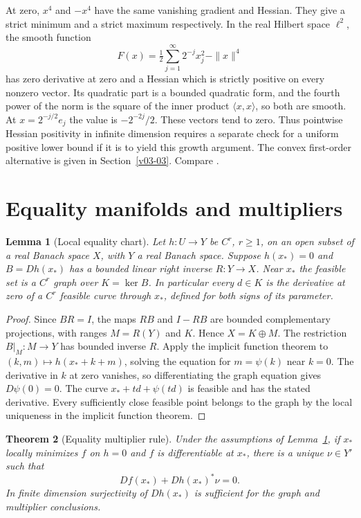 \documentclass[11pt,oneside,openany]{book}
\theoremstyle{plain}
\newtheorem{theorem}{Theorem}[chapter]
\newtheorem{lemma}[theorem]{Lemma}
\theoremstyle{definition}
\theoremstyle{remark}
\begin{document}
At zero, \(x^4\) and \(-x^4\) have the same vanishing
gradient and Hessian. They give a strict minimum and
a strict maximum respectively. In the real Hilbert
space \(\ell^2\), the smooth function
\[
 F(x)=\tfrac12\sum_{j=1}^\infty 2^{-j}x_j^2-\|x\|^4
\]
has zero derivative at zero and a Hessian which is
strictly positive on every nonzero vector. Its
quadratic part is a bounded quadratic form, and
the fourth power of the norm is the square of the
inner product \(\langle x,x\rangle\), so both are
smooth. At \(x=2^{-j/2}e_j\) the value is
\(-2^{-2j}/2\). These vectors tend to zero.
Thus pointwise Hessian positivity in infinite
dimension requires a separate check for a uniform
positive lower bound if it is to yield this growth
argument. The convex first-order alternative is
given in Section~\ref{v03-03}.
Compare \cite[Theorems 2.1--2.5]{NocedalWright}.

\section{Equality manifolds and multipliers}
\label{v06-02}

\begin{lemma}[Local equality chart]\label{lem:equality-chart}
Let \(h:U\to Y\) be \(C^r\), \(r\ge1\), on an open subset
of a real Banach space \(X\), with \(Y\) a real Banach
space. Suppose \(h(x_*)=0\) and \(B=Dh(x_*)\) has a
bounded linear right inverse \(R:Y\to X\).
Near \(x_*\) the feasible set is a \(C^r\) graph
over \(K=\ker B\). In particular every \(d\in K\)
is the derivative at zero of a \(C^r\) feasible
curve through \(x_*\), defined for both signs of its
parameter.
\end{lemma}

\begin{proof}
Since \(BR=I\), the maps \(RB\) and \(I-RB\) are
bounded complementary projections, with ranges
\(M=R(Y)\) and \(K\). Hence \(X=K\oplus M\).
The restriction \(B|_M:M\to Y\) has bounded inverse
\(R\). Apply the implicit function theorem to
\((k,m)\mapsto h(x_*+k+m)\), solving the equation
for \(m=\psi(k)\) near \(k=0\).
The derivative in \(k\) at zero vanishes, so
differentiating the graph equation gives \(D\psi(0)=0\).
The curve \(x_*+td+\psi(td)\) is feasible and has
the stated derivative. Every sufficiently close
feasible point belongs to the graph by the
local uniqueness in the implicit function theorem.
\end{proof}

\begin{theorem}[Equality multiplier rule]\label{thm:equality-multipliers}
Under the assumptions of Lemma~\ref{lem:equality-chart},
if \(x_*\) locally minimizes \(f\) on \(h=0\) and \(f\)
is differentiable at \(x_*\), there is a unique
\(\nu\in Y'\) such that
\[
 Df(x_*)+Dh(x_*)^*\nu=0.
\]
In finite dimension surjectivity of \(Dh(x_*)\)
is sufficient for the graph and multiplier conclusions.
\end{theorem}
\end{document}
